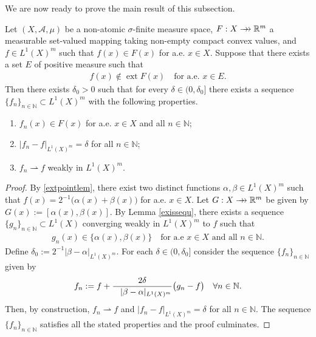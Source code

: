 \documentclass[hidelinks,onefignum,onetabnum]{siamart220329}
\newcommand{\rrightarrow}{\mathrel{\mathrlap{\rightarrow}\mkern1mu\rightarrow}}
\let\twoheadrightarrow\rrightarrow
\newcommand{\ext}{\operatorname{ext}}
\begin{document}
We are now ready to prove the main result of this subsection.
\begin{theorem}\label{Clustering}
	Let $(X,\mathcal A,\mu)$ be a  non-atomic $\sigma$-finite measure space, $F:X\twoheadrightarrow\mathbb R^m$  a measurable set-valued mapping taking non-empty compact convex values, and $f\in {L^1(X)^m}$ such that $f(x)\in F(x)$ for a.e. $x\in X$. Suppose that there exists a set $E$ of positive measure such that 
	\begin{align*}
		f(x)\notin \ext F(x)\quad\text{for a.e. $x\in E$}.
	\end{align*}
	Then there exists $\delta_0>0$ such that for every $\delta\in(0,\delta_0]$ there exists a sequence $\{f_n\}_{n\in\mathbb N}\subset {L^1(X)^m}$ with the following properties. 
	\begin{enumerate}
		\item $f_n(x)\in F(x)$ for a.e. $x\in X$ and all $n\in\mathbb N$;
		
		\item $|f_{n}-f|_{{L^1(X)^m}}=\delta$ for all $n\in\mathbb N$; 
		
		\item $f_n\rightharpoonup f$ weakly in ${L^1(X)^m}$.
	\end{enumerate}
\end{theorem}
\begin{proof}
	By \cref{extpointlem}, there exist two distinct functions $\alpha,\beta\in {L^1(X)^m}$ such that $f(x)=2^{-1}\big(\alpha(x)+\beta(x)\big)$ for  a.e. $x\in X$. 
	Let $G:X\twoheadrightarrow\mathbb R^m$ be given by $G(x):=[\alpha(x),\beta(x)]$.
	By Lemma \ref{exissequ}, there exists a sequence $\{g_n\}_{n\in\mathbb N}\subset {L^1(X)}$ converging weakly in ${L^1(X)^m}$ to $f$ such that 
	\begin{align*}
		g_{n}(x)\in\{\alpha(x),\beta(x)\}\quad\text{for a.e $x\in X$ and all $n\in\mathbb N$}.
	\end{align*}
	Define $\delta_0:=2^{-1}|\beta-\alpha|_{{L^1(X)^m}}$. For each  $\delta\in(0,\delta_0]$ consider the sequence $\{f_n\}_{n\in\mathbb N}$ given by
	\begin{align*}
		f_n:=f+\frac{2\delta}{\hspace*{0.3cm}|\beta-\alpha|_{{L^1(X)^m}}}\big(g_n-f\big)\quad\forall n\in\mathbb N.
	\end{align*}
	Then, by construction, $f_n\rightharpoonup f$ and $|f_n-f|_{{L^1(X)^m}}=\delta$ for all $n\in\mathbb N$. The sequence $\{f_n\}_{n\in\mathbb N}$ satisfies all the stated properties and the proof culminates.
\end{proof}
\end{document}
